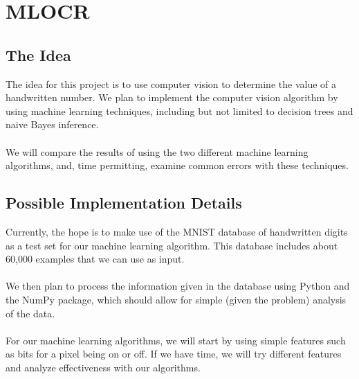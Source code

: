 \documentclass{article}
\theoremstyle{definition}
\theoremstyle{remark}
\begin{document}
	 \section*{MLOCR}
	\label*{Optical Character Recognition using Machine Learning}
	   \subsection*{The Idea}
     The idea for this project is to use computer vision to determine the value of a handwritten number. We plan to implement the computer vision algorithm by using machine learning techniques, including but not limited to decision trees and naive Bayes inference. \\\\
     We will compare the results of using the two different machine learning algorithms, and, time permitting, examine common errors with these techniques.
     \subsection*{Possible Implementation Details}
     Currently, the hope is to make use of the MNIST database of handwritten digits as a test set for our machine learning algorithm. This database includes about 60,000 examples that we can use as input. \\\\
     We then plan to process the information given in the database using Python and the NumPy package, which should allow for simple (given the problem) analysis of the data. \\\\
     For our machine learning algorithms, we will start by using simple features such as bits for a pixel being on or off. If we have time, we will try different features and analyze effectiveness with our algorithms.
     
    
\end{document}
